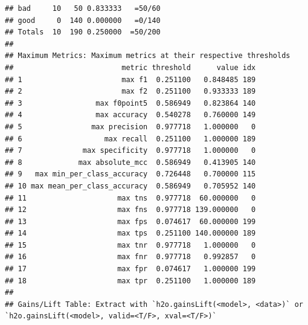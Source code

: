 \documentclass[
]{book}
\begin{document}
\begin{verbatim}
## bad     10   50 0.833333   =50/60
## good     0  140 0.000000   =0/140
## Totals  10  190 0.250000  =50/200
## 
## Maximum Metrics: Maximum metrics at their respective thresholds
##                         metric threshold      value idx
## 1                       max f1  0.251100   0.848485 189
## 2                       max f2  0.251100   0.933333 189
## 3                 max f0point5  0.586949   0.823864 140
## 4                 max accuracy  0.540278   0.760000 149
## 5                max precision  0.977718   1.000000   0
## 6                   max recall  0.251100   1.000000 189
## 7              max specificity  0.977718   1.000000   0
## 8             max absolute_mcc  0.586949   0.413905 140
## 9   max min_per_class_accuracy  0.726448   0.700000 115
## 10 max mean_per_class_accuracy  0.586949   0.705952 140
## 11                     max tns  0.977718  60.000000   0
## 12                     max fns  0.977718 139.000000   0
## 13                     max fps  0.074617  60.000000 199
## 14                     max tps  0.251100 140.000000 189
## 15                     max tnr  0.977718   1.000000   0
## 16                     max fnr  0.977718   0.992857   0
## 17                     max fpr  0.074617   1.000000 199
## 18                     max tpr  0.251100   1.000000 189
## 
## Gains/Lift Table: Extract with `h2o.gainsLift(<model>, <data>)` or `h2o.gainsLift(<model>, valid=<T/F>, xval=<T/F>)`
\end{verbatim}
\end{document}
